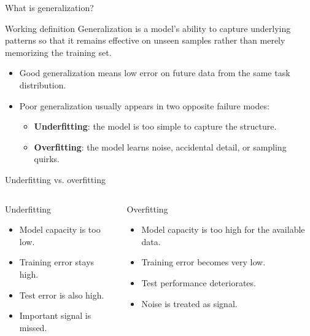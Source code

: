 \documentclass[12pt]{beamer}
\begin{document}
\begin{frame}{What is generalization?}
  \begin{conceptbox}{Working definition}
    Generalization is a model's ability to capture underlying patterns so that it remains effective
    on unseen samples rather than merely memorizing the training set.
  \end{conceptbox}
  \begin{itemize}
    \item Good generalization means low error on future data from the same task distribution.
    \item Poor generalization usually appears in two opposite failure modes:
      \begin{itemize}
        \item \textbf{Underfitting}: the model is too simple to capture the structure.
        \item \textbf{Overfitting}: the model learns noise, accidental detail, or sampling quirks.
      \end{itemize}
  \end{itemize}
\end{frame}

\begin{frame}{Underfitting vs. overfitting}
  \begin{columns}[T]
      \begin{warningbox}{Underfitting}
        \begin{itemize}
          \item Model capacity is too low.
          \item Training error stays high.
          \item Test error is also high.
          \item Important signal is missed.
        \end{itemize}
      \end{warningbox}
      \begin{warningbox}{Overfitting}
        \begin{itemize}
          \item Model capacity is too high for the available data.
          \item Training error becomes very low.
          \item Test performance deteriorates.
          \item Noise is treated as signal.
        \end{itemize}
      \end{warningbox}
  \end{columns}
\end{frame}
\end{document}
